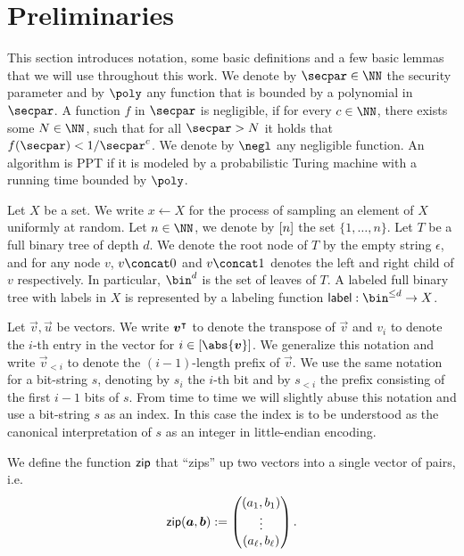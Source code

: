\section{Preliminaries}\label{sec:prelim}
This section introduces notation, some basic definitions and a few basic lemmas that we will use throughout this work.
We denote by $\secpar\in\NN$ the security parameter and by $\poly$ any function that is bounded by a polynomial in $\secpar$.
A function $f$ in $\secpar$ is negligible, if for every $c \in \NN$, there exists some $N\in\NN$, such that for all $\secpar>N$ it holds that $f(\secpar) < 1/\secpar^c$.
We denote by $\negl$ any negligible function.
An algorithm is PPT if it is modeled by a probabilistic Turing machine with a running time bounded by $\poly$.

Let $X$ be a set.
We write $x\gets X$ for the process of sampling an element of $X$ uniformly at random.
Let $n\in\NN$, we denote by $[n]$ the set $\{1,\dots,n\}$.
Let $T$ be a full binary tree of depth $d$.
We denote the root node of $T$ by the empty string $\epsilon$, and for any node $v$, $v\concat 0$ and $v\concat 1$ denotes the left and right child of $v$ respectively.
In particular, $\bin^d$ is the set of leaves of $T$.
A labeled full binary tree with labels in $X$ is represented by a labeling function $\lbl : \bin^{\leq d} \to X$.

Let $\vec{v},\vec{u}$ be vectors.
We write $\boldsymbol{v}^\intercal$ to denote the transpose of $\vec{v}$ and $v_i$ to denote the $i$-th entry in the vector for $i\in\interval{\abs{\vec{v}}}$.
We generalize this notation and write $\vec{v}_{< i}$ to denote the $(i-1)$-length prefix of $\vec{v}$.
We use the same notation for a bit-string $s$, denoting by $s_i$ the $i$-th bit and by $s_{<i}$ the prefix consisting of the first $i-1$ bits of $s$.
From time to time we will slightly abuse this notation and use a bit-string $s$ as an index.
In this case the index is to be understood as the canonical interpretation of $s$ as an integer in little-endian encoding.

We define the function $\mathsf{zip}$ that \enquote{zips} up two vectors into a single vector of pairs, i.e.
\[
\mathsf{zip}(\boldsymbol{a},\boldsymbol{b}) := \begin{pmatrix}(a_1,b_1)\\
\vdots\\
(a_\ell,b_\ell) \end{pmatrix}.
\]

